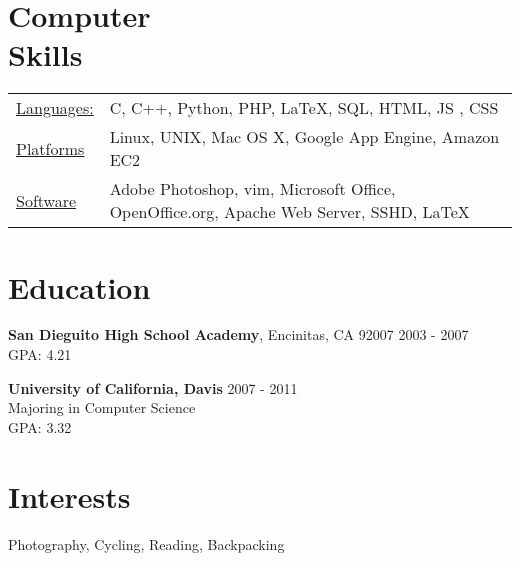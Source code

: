 \documentclass[margin]{res}
\begin{document}
\begin{resume}
\section{Computer \\ Skills}
   \begin{tabular}{l p{3in}}
   \underline{Languages:} & C, C++, Python, PHP, \LaTeX, SQL, HTML, JS , CSS  \\
   \underline{Platforms} & Linux, UNIX, Mac OS X, Google App Engine, Amazon EC2\\
   \underline{Software} & Adobe Photoshop, vim, Microsoft Office, OpenOffice.org, Apache Web Server, SSHD, \LaTeX \\
 \end{tabular}

\section{Education} 
{\bf San Dieguito High School Academy}, Encinitas, CA 92007 \hfill 2003 - 2007 \\
 GPA: 4.21

{\bf University of California, Davis}  \hfill 2007 - 2011\\
Majoring in Computer Science \\
GPA: 3.32

\section{Interests}
Photography, Cycling, Reading, Backpacking

\end{resume} 
\end{document}
